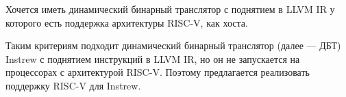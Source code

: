Хочется иметь динамический бинарный транслятор с поднятием в LLVM IR у которого есть поддержка архитектуры RISC-V, как хоста.

Таким критериям подходит динамический бинарный транслятор (далее --- ДБТ) Instrew с поднятием инструкций в LLVM IR, но он не запускается на процессорах с архитектурой RISC-V. Поэтому предлагается реализовать поддержку RISC-V для Instrew.







